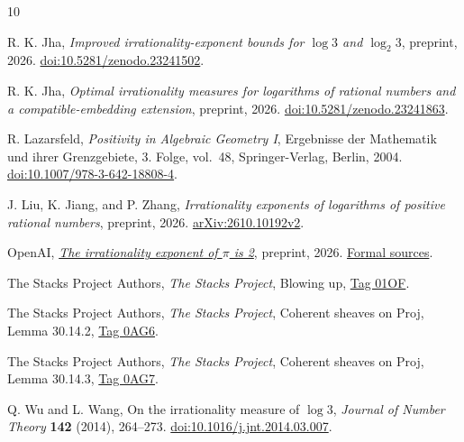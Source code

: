 \begin{thebibliography}{10}

R. K. Jha, \emph{Improved irrationality-exponent bounds for
\(\log 3\) and \(\log_2 3\)}, preprint, 2026.
\href{https://doi.org/10.5281/zenodo.23241502}{doi:10.5281/zenodo.23241502}.

R. K. Jha, \emph{Optimal irrationality measures for logarithms of
rational numbers and a compatible-embedding extension},
preprint, 2026.
\href{https://doi.org/10.5281/zenodo.23241863}{doi:10.5281/zenodo.23241863}.

R. Lazarsfeld, \emph{Positivity in Algebraic Geometry I},
Ergebnisse der Mathematik und ihrer Grenzgebiete, 3. Folge, vol.~48,
Springer-Verlag, Berlin, 2004.
\href{https://doi.org/10.1007/978-3-642-18808-4}{doi:10.1007/978-3-642-18808-4}.

J. Liu, K. Jiang, and P. Zhang, \emph{Irrationality exponents of
logarithms of positive rational numbers}, preprint, 2026.
\href{https://arxiv.org/abs/2610.10192v2}{arXiv:2610.10192v2}.

OpenAI,
\href{https://github.com/openai/math/blob/adc7f1241b42e322a6451854ab7e4b4c146bf78a/preprints/The-irrationality-exponent-of-pi-is-2-September-24-2026/paper.pdf}{\emph{The irrationality exponent of \(\pi\) is 2}},
preprint, 2026.
\href{https://github.com/openai/math/tree/adc7f1241b42e322a6451854ab7e4b4c146bf78a/lean}{Formal sources}.

The Stacks Project Authors, \emph{The Stacks Project},
Blowing up, \href{https://stacks.math.columbia.edu/tag/01OF}{Tag 01OF}.

The Stacks Project Authors, \emph{The Stacks Project},
Coherent sheaves on Proj, Lemma 30.14.2,
\href{https://stacks.math.columbia.edu/tag/0AG6}{Tag 0AG6}.

The Stacks Project Authors, \emph{The Stacks Project},
Coherent sheaves on Proj, Lemma 30.14.3,
\href{https://stacks.math.columbia.edu/tag/0AG7}{Tag 0AG7}.

Q. Wu and L. Wang, On the irrationality measure of \(\log 3\),
\emph{Journal of Number Theory} \textbf{142} (2014), 264--273.
\href{https://doi.org/10.1016/j.jnt.2014.03.007}{doi:10.1016/j.jnt.2014.03.007}.

\end{thebibliography}
